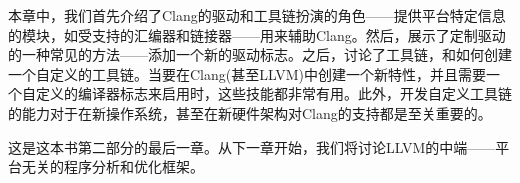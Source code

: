本章中，我们首先介绍了Clang的驱动和工具链扮演的角色——提供平台特定信息的模块，如受支持的汇编器和链接器——用来辅助Clang。然后，展示了定制驱动的一种常见的方法——添加一个新的驱动标志。之后，讨论了工具链，和如何创建一个自定义的工具链。当要在Clang(甚至LLVM)中创建一个新特性，并且需要一个自定义的编译器标志来启用时，这些技能都非常有用。此外，开发自定义工具链的能力对于在新操作系统，甚至在新硬件架构对Clang的支持都是至关重要的。

这是这本书第二部分的最后一章。从下一章开始，我们将讨论LLVM的中端——平台无关的程序分析和优化框架。